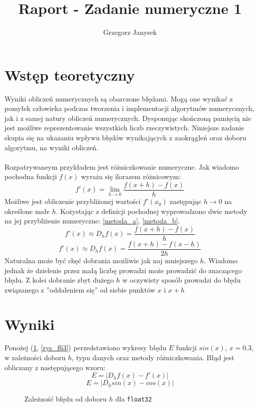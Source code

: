 \documentclass[11pt]{extarticle}
\author{Grzegorz Janysek}
\title{Raport - Zadanie numeryczne 1}
\begin{document}
\maketitle

	\section{Wstęp teoretyczny}
	
	Wyniki obliczeń numerycznych są obarczone błędami.
	Mogą one wynikać z pomyłek człowieka podczas tworzenia i implementacji algorytmów numerycznych, jak i z samej natury obliczeń numerycznych.
	Dysponując skończoną pamięcią nie jest możliwe reprezentowanie wszystkich liczb rzeczywistych.
	Niniejsze zadanie skupia się na ukazaniu wpływu błędów wynikających z zaokrągleń oraz doboru algorytmu, na wyniki obliczeń.
	\paragraph{}
	Rozpatrywaneym przykładem jest różniczkowanie numeryczne.
	Jak wiadomo pochodna funkcji \( f(x) \) wyraża się ilorazem różnicowym:
	\[ f'(x) = \lim_{h \to 0} \frac{f(x+h)-f(x)}{h} \]
	Możliwe jest obliczenie przybliżonej wartości \( f'(x_0) \) zastępując \( h \to 0 \) na określone małe \( h \).
	Kożystając z definicji pochodnej wyprowadzono dwie metody na jej przybliżenie numeryczne: \eqref{metoda_a}, \eqref{metoda_b}.
	\[ 
		f'(x) \approx D_hf(x) = \frac{f(x+h)-f(x)}{h}
		\label{metoda_a} \tag{Metoda a}
	\]
	\[
		f'(x) \approx D_hf(x) = \frac{f(x+h)-f(x-h)}{2h}
		\label{metoda_b} \tag{Metoda b}
	\]
	Naturalna może być chęć dobrania możliwie jak naj mniejszego \( h \). Wiadomo jednak że dzielenie przez małą liczbę prowadzi może prowadzić do znaczącego błędu. Z kolei dobranie zbyt dużego \( h \) w oczywisty sposób prowadzi do błędu związanego z ''oddaleniem się'' od siebie punktów \( x \) i \( x+h \)

	\section{Wyniki}

	Ponożej (\ref{rys_f32}, \ref{rys_f63}) perzedstawiono wykresy błędu \( E \) funkcji \( sin(x) \), \( x=0.3\), w zależności doboru \( h \), typu danych oraz metody różniczkowania.
	Błąd jest obliczany z następującego wzoru:
	\[ E = |D_hf(x) - f'(x)|\]
	\[ E = |D_hsin(x) - cos(x)|\]

	\pagebreak

	\begin{figure}[H]
		\begin{center}
			
		\end{center}
		\caption{Zależność błędu od doboru \( h \) dla \texttt{float32}}
		\label{rys_f32}
	\end{figure}
\end{document}
